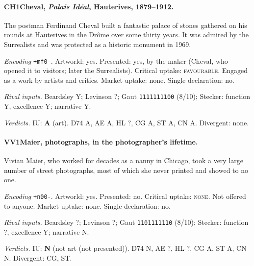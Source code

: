 \paragraph{CH1\enspace Cheval, \emph{Palais Id\'eal}, Hauterives, 1879--1912.}
The postman Ferdinand Cheval built a fantastic palace of stones gathered on his rounds at Hauterives in the Dr\^ome over some thirty years. It was admired by the Surrealists and was protected as a historic monument in 1969.\par
\noindent\textit{Encoding} \texttt{+mf0-}. Artworld: yes. Presented: yes, by the maker (Cheval, who opened it to visitors; later the Surrealists). Critical uptake: \textsc{favourable}. Engaged as a work by artists and critics. Market uptake: none. Single declaration: no.\par
\noindent\textit{Rival inputs.} Beardsley Y; Levinson ?; Gaut \texttt{1111111100} (8/10); Stecker: function Y, excellence Y; narrative Y.\par
\noindent\textit{Verdicts.} IU: \textbf{A} (art). D74 A, AE A, HL ?, CG A, ST A, CN A. Divergent: none.\par

\paragraph{VV1\enspace Maier, photographs, in the photographer's lifetime.}
Vivian Maier, who worked for decades as a nanny in Chicago, took a very large number of street photographs, most of which she never printed and showed to no one.\par
\noindent\textit{Encoding} \texttt{+n00-}. Artworld: yes. Presented: no. Critical uptake: \textsc{none}. Not offered to anyone. Market uptake: none. Single declaration: no.\par
\noindent\textit{Rival inputs.} Beardsley ?; Levinson ?; Gaut \texttt{1101111110} (8/10); Stecker: function ?, excellence Y; narrative N.\par
\noindent\textit{Verdicts.} IU: \textbf{N} (not art (not presented)). D74 N, AE ?, HL ?, CG A, ST A, CN N. Divergent: CG, ST.\par

